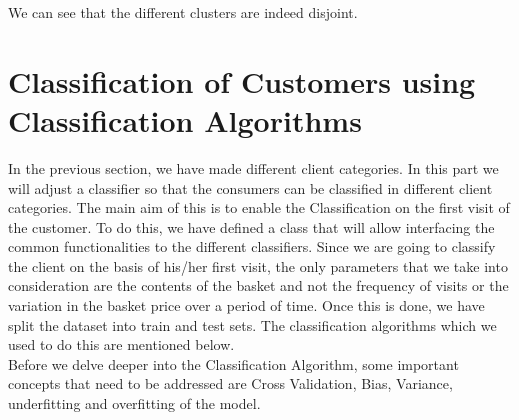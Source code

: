 We can see that the different clusters are indeed disjoint.

\section{Classification of Customers using Classification Algorithms}

In the previous section, we have made different client categories. In this part we will adjust a classifier so that the consumers can be classified in different client categories. The main aim of this is to enable the Classification on the first visit of the customer. To do this, we have defined a class that will allow interfacing the common functionalities to the different classifiers. Since we are going to classify the client on the basis of his/her first visit, the only parameters that we take into consideration are the contents of the basket and not the frequency of visits or the variation in the basket price over a period of time. Once this is done, we have split the dataset into train and test sets. The classification algorithms which we used to do this are mentioned below.\\
Before we delve deeper into the Classification Algorithm, some important concepts that need to be addressed are Cross Validation, Bias, Variance, underfitting and overfitting of the model.
